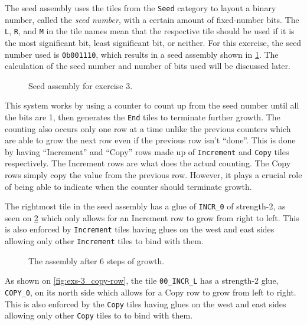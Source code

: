 \documentclass[11pt]{article}
\begin{document}
The seed assembly uses the tiles from the \verb|Seed| category to layout a binary number, called the
\textit{seed number}, with a certain amount of fixed-number bits. The \verb|L|, \verb|R|, and
\verb|M| in the tile names mean that the respective tile should be used if it is the most
significant bit, least significant bit, or neither. For this exercise, the seed number used is
\verb|0b001110|, which results in a seed assembly shown in \cref{fig:exs-3_seed-assembly}. The
calculation of the seed number and number of bits used will be discussed later.

\begin{figure}[htbp]
    \centering
    \caption{Seed assembly for exercise 3.}
    \label{fig:exs-3_seed-assembly}
\end{figure}


This system works by using a counter to count up from the seed number until all the bits are 1, then
generates the \verb|End| tiles to terminate further growth. The counting also occurs only one row at
a time unlike the previous counters which are able to grow the next row even if the previous row
isn't ``done''. This is done by having ``Increment'' and ``Copy'' rows made up of \verb|Increment|
and \verb|Copy| tiles respectively. The Increment rows are what does the actual counting. The Copy
rows simply copy the value from the previous row. However, it plays a crucial role of being able to
indicate when the counter should terminate growth.

The rightmost tile in the seed assembly has a glue of \verb|INCR_0| of strength-2, as seen on
\cref{fig:exs-3_incr-row} which only allows for an Increment row to grow from right to left.
This is also enforced by \verb|Increment| tiles having glues on the west and east sides allowing
only other \verb|Increment| tiles to bind with them.

\begin{figure}[htbp]
    \centering
    
    \caption{The assembly after 6 steps of growth.}
    \label{fig:exs-3_incr-row}
\end{figure}

As shown on \cref{fig:exs-3_copy-row}, the tile \verb|00_INCR_L| has a strength-2 glue,
\verb|COPY_0|, on its north side which allows for a Copy row to grow from left to right. This is
also enforced by the \verb|Copy| tiles having glues on the west and east sides allowing only other
\verb|Copy| tiles to to bind with them.
\end{document}
